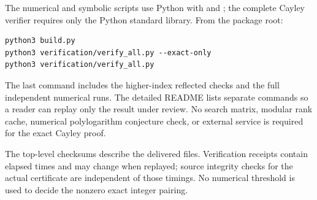 The numerical and symbolic scripts use Python with  and
; the complete Cayley verifier requires only the Python
standard library. From the package root:
\begin{verbatim}
python3 build.py
python3 verification/verify_all.py --exact-only
python3 verification/verify_all.py
\end{verbatim}
The last command includes the higher-index reflected checks and the
full independent numerical runs. The detailed README lists separate
commands so a reader can replay only the result under review. No search
matrix, modular rank cache, numerical polylogarithm conjecture check,
or external service is required for the exact Cayley proof.

The top-level checksums describe the delivered files. Verification
receipts contain elapsed times and may change when replayed; source
integrity checks for the actual certificate are independent of those
timings. No numerical threshold is used to decide the nonzero exact
integer pairing.
